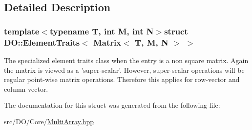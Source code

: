\subsection{Detailed Description}
\subsubsection*{template$<$typename T, int M, int N$>$struct D\-O\-::\-Element\-Traits$<$ Matrix$<$ T, M, N $>$ $>$}

The specialized element traits class when the entry is a non square matrix. Again the matrix is viewed as a 'super-\/scalar'. However, super-\/scalar operations will be regular point-\/wise matrix operations. Therefore this applies for row-\/vector and column vector. 

The documentation for this struct was generated from the following file\-:\begin{DoxyCompactItemize}
\item 
src/\-D\-O/\-Core/\hyperlink{_multi_array_8hpp}{Multi\-Array.\-hpp}\end{DoxyCompactItemize}
